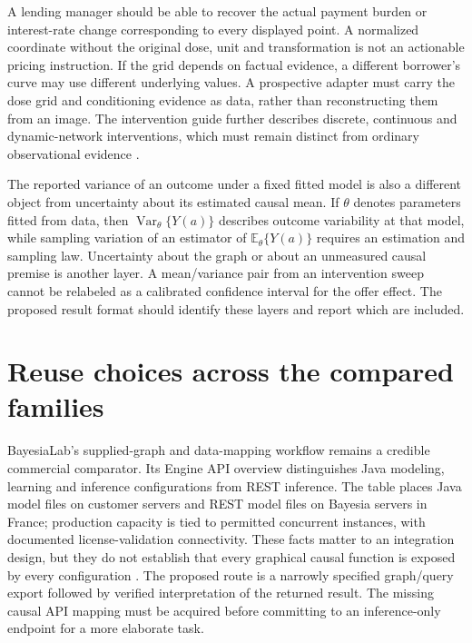 A lending manager should be able to recover the actual payment burden or
interest-rate change corresponding to every displayed point. A normalized
coordinate without the original dose, unit and transformation is not an
actionable pricing instruction. If the grid depends on factual evidence, a
different borrower's curve may use different underlying values. A prospective
adapter must carry the dose grid and conditioning evidence as data, rather
than reconstructing them from an image. The intervention guide further
describes discrete, continuous and dynamic-network interventions, which must
remain distinct from ordinary observational evidence
\citep{exec14_ci_interventions}.

The reported variance of an outcome under a fixed fitted model is also a
different object from uncertainty about its estimated causal mean. If
$\theta$ denotes parameters fitted from data, then
$\operatorname{Var}_{\theta}\{Y(a)\}$ describes outcome variability at
that model, while sampling variation of an estimator of
$\mathbb E_{\theta}\{Y(a)\}$ requires an estimation and sampling law.
Uncertainty about the graph or about an unmeasured causal premise is another
layer. A mean/variance pair from an intervention sweep cannot be relabeled as
a calibrated confidence interval for the offer effect. The proposed result
format should identify these layers and report which are included.

\section{Reuse choices across the compared families}

BayesiaLab's supplied-graph and data-mapping workflow remains a credible
commercial comparator. Its Engine API overview distinguishes Java modeling,
learning and inference configurations from REST inference. The table places
Java model files on customer servers and REST model files on Bayesia servers
in France; production capacity is tied to permitted concurrent instances,
with documented license-validation connectivity. These facts matter to an
integration design, but they do not establish that every graphical causal
function is exposed by every configuration
\citep{exec13_bayesia_api,exec13_bayesia_professional}. The proposed route is
a narrowly specified graph/query export followed by verified interpretation
of the returned result. The missing causal API mapping must be acquired before
committing to an inference-only endpoint for a more elaborate task.

